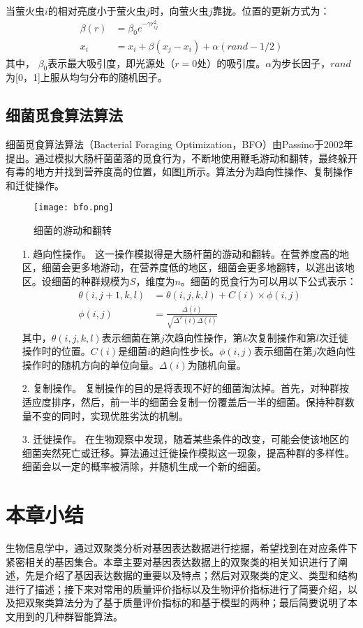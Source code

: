    当萤火虫$i$的相对亮度小于萤火虫$j$时，向萤火虫$j$靠拢。位置的更新方式为：
    \begin{align}
      \beta(r)&=\beta_0e^{-\gamma r_{ij}^2} \\
      x_i&=x_i+\beta(x_j-x_i)+\alpha(rand-1/2)
    \end{align}
    其中， $\beta_0$表示最大吸引度，即光源处（$r=0$处）的吸引度。$\alpha$为步长因子，$rand$为[0，1]上服从均匀分布的随机因子。

  \subsection{细菌觅食算法算法}
  细菌觅食算法算法（Bacterial Foraging Optimization，BFO）由Passino于2002年提出。通过模拟大肠杆菌菌落的觅食行为，不断地使用鞭毛游动和翻转，最终躲开有毒的地方并找到营养度高的位置，如图\ref{fig:bfo}所示。算法分为趋向性操作、复制操作和迁徙操作。
  \begin{figure}[htbp]
    \centering
    \texttt{[image: bfo.png]}
    \caption{细菌的游动和翻转}
    \label{fig:bfo}
  \end{figure}

  \begin{enumerate}
    \item[1.] 趋向性操作。 
    这一操作模拟得是大肠杆菌的游动和翻转。在营养度高的地区，细菌会更多地游动，在营养度低的地区，细菌会更多地翻转，以逃出该地区。设细菌的种群规模为$S$，维度为$n$。细菌的觅食行为可以用以下公式表示：
    \begin{align}
      \theta(i,j+1,k,l) &= \theta(i,j,k,l) + C(i) \times \phi(i,j) \\
      \phi(i,j) &= \frac{\Delta(i)}{\sqrt{\Delta^T(i)\Delta(i)}}
    \end{align}
    其中，$\theta(i,j,k,l)$表示细菌在第$j$次趋向性操作，第$k$次复制操作和第$l$次迁徙操作时的位置。$C(i)$是细菌$i$的趋向性步长。$\phi(i,j)$表示细菌在第$j$次趋向性操作时的随机方向的单位向量。$\Delta(i)$为随机向量。

    \item[2.] 复制操作。
    复制操作的目的是将表现不好的细菌淘汰掉。首先，对种群按适应度排序，然后，前一半的细菌会复制一份覆盖后一半的细菌。保持种群数量不变的同时，实现优胜劣汰的机制。

    \item[3.] 迁徙操作。
    在生物观察中发现，随着某些条件的改变，可能会使该地区的细菌突然死亡或迁移。算法通过迁徙操作模拟这一现象，提高种群的多样性。细菌会以一定的概率被清除，并随机生成一个新的细菌。
    
  \end{enumerate}

\section{本章小结}
生物信息学中，通过双聚类分析对基因表达数据进行挖掘，希望找到在对应条件下紧密相关的基因集合。本章主要对基因表达数据上的双聚类的相关知识进行了阐述，先是介绍了基因表达数据的重要以及特点；然后对双聚类的定义、类型和结构进行了描述；接下来对常用的质量评价指标以及生物评价指标进行了简要介绍，以及把双聚类算法分为了基于质量评价指标的和基于模型的两种；最后简要说明了本文用到的几种群智能算法。